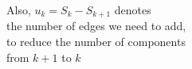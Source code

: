 \documentclass[preview]{standalone}
\begin{document}
\begin{center}
Also, $u_k = S_k - S_{k+1}$ denotes \\the number of edges we need to add,\\ to reduce the number of components\\ from $k+1$ to $k$
\end{center}
\end{document}
